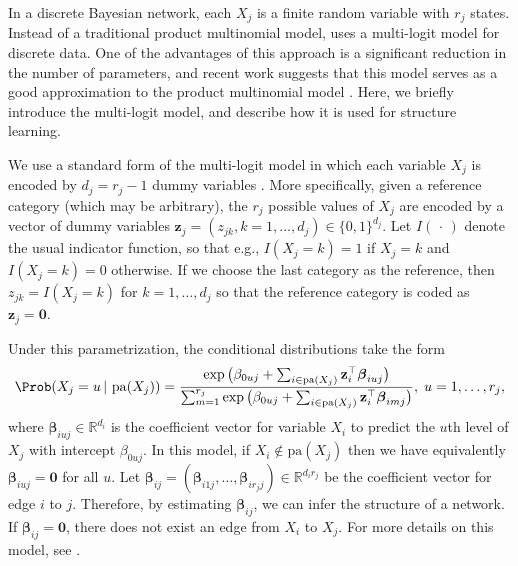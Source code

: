 \documentclass[article]{jss}
\DeclareMathOperator*{\pa}{pa}
\newcommand{\dummy}{\mathbf{z}}
\renewcommand{\|}{\,|\,}
\begin{document}
In a discrete Bayesian network, each $X_j$ is a finite random variable with $r_j$ states. Instead of a traditional product multinomial model,  uses a multi-logit model for discrete data. One of the advantages of this approach is a significant reduction in the number of parameters, and recent work suggests that this model serves as a good approximation to the product multinomial model \citep{gu2018}. Here, we briefly introduce the multi-logit model, and describe how it is used for structure learning.

We use a standard form of the multi-logit model in which each variable $X_j$ is encoded by $d_j = r_j-1$ dummy variables \citep{dobson2008}. More specifically, given a reference category (which may be arbitrary), the $r_{j}$ possible values of $X_{j}$ are encoded by a vector of dummy variables $\mathbf{z}_{j}=(z_{jk},k=1,\ldots,d_j)\in\{0,1\}^{d_{j}}$. Let $I(\,\cdot\,)$ denote the usual indicator function, so that e.g., $I(X_j=k)=1$ if $X_{j}=k$ and $I(X_j=k)=0$ otherwise. If we choose the last category as the reference, then $z_{jk}=I(X_j=k)$ for $k=1,\ldots, d_{j}$ so that the reference category is coded as $\mathbf{z}_j=\mathbf{0}$. %

Under this parametrization, the conditional distributions take the form
\begin{eqnarray}\label{eq:mlogit}
\Prob(X_j=u \| \pa(X_{j})) 
= \dfrac{\exp\big(\beta_{0u j}+\sum_{i\in\pa(X_{j})}\dummy_{i}^{\top}\boldsymbol{\beta}_{iuj}\big)}{\sum_{m=1}^{r_j}\exp\big(\beta_{0u j}+\sum_{i\in\pa(X_{j})}\dummy_{i}^{\top}\boldsymbol{\beta}_{imj}\big)}, \; u=1, \ldots, r_j,
\end{eqnarray}
where $\boldsymbol{\beta}_{iu j} \in \mathbb{R}^{d_i}$ is the coefficient vector for variable $X_i$ to predict the $u$th level of $X_j$ with intercept $\beta_{0u j}$. In this model, if $X_i \notin \text{pa}(X_j)$ then we have equivalently $\boldsymbol{\beta}_{iu j}=\mathbf{0}$ for all $u$. Let 
$\boldsymbol{\beta}_{ij}
=(\boldsymbol{\beta}_{i1j}, \ldots,
\boldsymbol{\beta}_{ir_j j}) \in \mathbb{R}^{d_ir_j}$
be the coefficient vector for edge $i$ to $j$.
 Therefore, by estimating $\boldsymbol{\beta}_{ij}$, we can infer the structure of a network. If $\boldsymbol{\beta}_{ij} = \mathbf{0}$, there does not exist an edge from $X_i$ to $X_j$. For more details on this model, see \citet{gu2018}.
\end{document}
